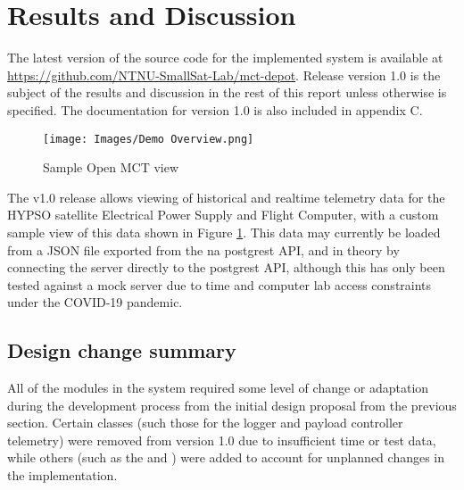 \begin{comment}
What was good/bad about the implementation?
 - Initial design was too simple, and didn’t account for various complexities in the what was required for Open MCT and other sources
 - DB design: Was this good? Could it be done better after making changes to how Open MCT best works with data?

What worked, and what didn’t?
\end{comment}

\section{Results and Discussion}
The latest version of the source code for the implemented system is available at \url{https://github.com/NTNU-SmallSat-Lab/mct-depot}. Release version 1.0 is the subject of the results and discussion in the rest of this report unless otherwise is specified. The documentation for version 1.0 is also included in appendix C.

\begin{figure}[ht]
  \centering
  \texttt{[image: Images/Demo Overview.png]}
  \caption{Sample Open MCT view}
  \label{fig:demoview}
\end{figure}

The v1.0 release allows viewing of historical and realtime telemetry data for the HYPSO satellite Electrical Power Supply and Flight Computer, with a custom sample view of this data shown in Figure \ref{fig:demoview}. This data may currently be loaded from a JSON file exported from the \acrshort{na} \Gls{postgrest} API, and in theory by connecting the server directly to the \Gls{postgrest} API, although this has only been tested against a mock server due to time and computer lab access constraints under the COVID-19 pandemic.

\subsection{Design change summary}
All of the modules in the system required some level of change or adaptation during the development process from the initial design proposal from the previous section. Certain classes (such those for the logger and payload controller telemetry) were removed from version 1.0 due to insufficient time or test data, while others (such as the  and ) were added to account for unplanned changes in the implementation.

